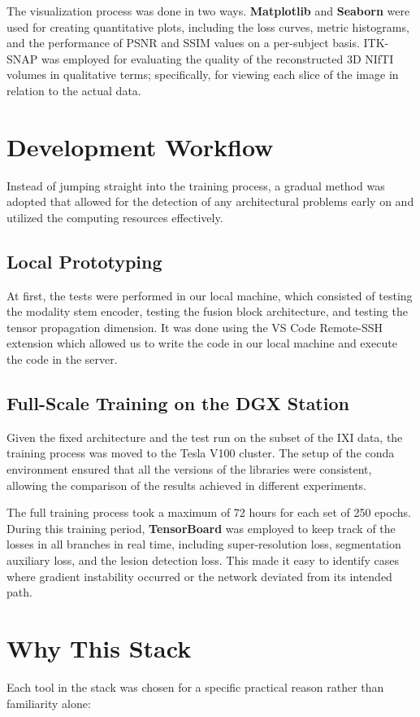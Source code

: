 The visualization process was done in two ways. \textbf{Matplotlib} and \textbf{Seaborn} were used for creating quantitative plots, including the loss curves, metric histograms, and the performance of PSNR and SSIM values on a per-subject basis. ITK-SNAP was employed for evaluating the quality of the reconstructed 3D NIfTI volumes in qualitative terms; specifically, for viewing each slice of the image in relation to the actual data.

\section{Development Workflow}
Instead of jumping straight into the training process, a gradual method was adopted that allowed for the detection of any architectural problems early on and utilized the computing resources effectively.

\subsection{Local Prototyping}
At first, the tests were performed in our local machine, which consisted of testing the modality stem encoder, testing the fusion block architecture, and testing the tensor propagation dimension. It was done using the VS Code Remote-SSH extension which allowed us to write the code in our local machine and execute the code in the server.

\subsection{Full-Scale Training on the DGX Station}
Given the fixed architecture and the test run on the subset of the IXI data, the training process was moved to the Tesla V100 cluster. The setup of the conda environment ensured that all the versions of the libraries were consistent, allowing the comparison of the results achieved in different experiments.

The full training process took a maximum of 72 hours for each set of 250 epochs. During this training period, \textbf{TensorBoard} was employed to keep track of the losses in all branches in real time, including super-resolution loss, segmentation auxiliary loss, and the lesion detection loss. This made it easy to identify cases where gradient instability occurred or the network deviated from its intended path.

\section{Why This Stack}
Each tool in the stack was chosen for a specific practical reason rather than familiarity alone:

